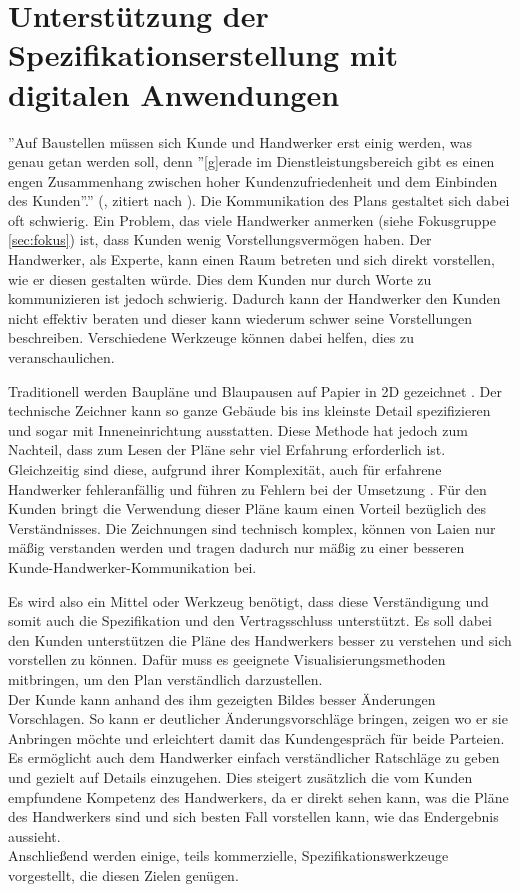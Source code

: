 \section{Unterstützung der Spezifikationserstellung mit digitalen Anwendungen}
\label{sec:spezi}

''Auf Baustellen müssen sich Kunde und Handwerker erst einig werden, was genau getan werden soll, denn ''[g]erade im Dienstleistungsbereich gibt es einen engen Zusammenhang zwischen hoher Kundenzufriedenheit und dem Einbinden des Kunden''.'' (\cite{TODO: Buchkapitel}, zitiert nach \cite{hentrich_arbeiten_2002}). Die Kommunikation des Plans gestaltet sich dabei oft schwierig. Ein Problem, das viele Handwerker anmerken (siehe Fokusgruppe \ref{sec:fokus}) ist, dass Kunden wenig Vorstellungsvermögen haben. Der Handwerker, als Experte, kann einen Raum betreten und sich direkt vorstellen, wie er diesen gestalten würde. Dies dem Kunden nur durch Worte zu kommunizieren ist jedoch schwierig. Dadurch kann der Handwerker den Kunden nicht effektiv beraten und dieser kann wiederum schwer seine Vorstellungen beschreiben. Verschiedene Werkzeuge können dabei helfen, dies zu veranschaulichen.

Traditionell werden Baupläne und Blaupausen auf Papier in 2D gezeichnet \cite{TODO: Buchkapitel}. Der technische Zeichner kann so ganze Gebäude bis ins kleinste Detail spezifizieren und sogar mit Inneneinrichtung ausstatten. Diese Methode hat jedoch zum Nachteil, dass zum Lesen der Pläne sehr viel Erfahrung erforderlich ist. Gleichzeitig sind diese, aufgrund ihrer Komplexität, auch für erfahrene Handwerker fehleranfällig und führen zu Fehlern bei der Umsetzung \cite{wang_using_2007}. Für den Kunden bringt die Verwendung dieser Pläne kaum einen Vorteil bezüglich des Verständnisses. Die Zeichnungen sind technisch komplex, können von Laien nur mäßig verstanden werden und tragen dadurch nur mäßig zu einer besseren Kunde-Handwerker-Kommunikation bei.

Es wird also ein Mittel oder Werkzeug benötigt, dass diese Verständigung und somit auch die Spezifikation und den Vertragsschluss unterstützt. Es soll dabei den Kunden unterstützen die Pläne des Handwerkers besser zu verstehen und sich vorstellen zu können. Dafür muss es geeignete Visualisierungsmethoden mitbringen, um den Plan verständlich darzustellen. \\
Der Kunde kann anhand des ihm gezeigten Bildes besser Änderungen Vorschlagen. So kann er deutlicher Änderungsvorschläge bringen, zeigen wo er sie Anbringen möchte und erleichtert damit das Kundengespräch für beide Parteien. \\
Es ermöglicht auch dem Handwerker einfach verständlicher Ratschläge zu geben und gezielt auf Details einzugehen. Dies steigert zusätzlich die vom Kunden empfundene Kompetenz des Handwerkers, da er direkt sehen kann, was die Pläne des Handwerkers sind und sich besten Fall vorstellen kann, wie das Endergebnis aussieht. \\
Anschließend werden einige, teils kommerzielle, Spezifikationswerkzeuge vorgestellt, die diesen Zielen genügen.


